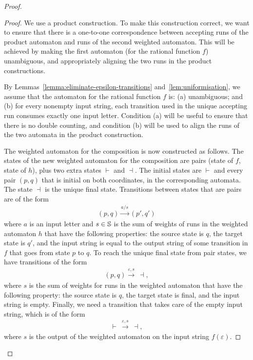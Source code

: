 \begin{proof}
    \begin{proof}
        We use a product construction. To make this construction correct, we want to ensure that there is a one-to-one correspondence between accepting runs of the product automaton and runs of the second weighted automaton. This will be achieved by making the first automaton (for the rational function $f$) unambiguous, and appropriately aligning the two runs in the product constructions.

        By Lemmas~\ref{lemma:eliminate-epsilon-transitions} and~\ref{lem:uniformisation}, we assume that the automaton for the rational function $f$ is: (a) unambiguous; and (b) for every nonempty input string, each transition used in the unique accepting run consumes exactly one input letter. Condition (a) will be useful to ensure that there is no double counting, and condition (b) will be used to align the runs of the two automata in the product construction.

        The weighted automaton for the composition is now constructed as follows.  
        The states of the new weighted automaton for the composition are pairs (state of $f$, state of $h$), plus two extra states $\vdash$ and  $\dashv$. The initial states are $\vdash$ and every pair $(p,q)$ that  is initial on both coordinates, in the corresponding automata. The state $\dashv$ is the unique final state. Transitions between states that are pairs are of the form
        \begin{align*}
        (p,q) \xrightarrow {a/s} (p',q')
        \end{align*}
        where $a$ is an input letter and $s \in \mathbb S$ is the sum of weights of runs in the weighted automaton $h$ that have the following properties: the source state is $q$, the target state is $q'$, and the input string is equal to the output string of some transition in $f$ that goes from state $p$ to $q$. To reach the unique final state from pair states, we have transitions of the form
        \begin{align*}
        (p,q) \xrightarrow {\varepsilon, s} \ \dashv,
        \end{align*}
        where $s$ is the sum of weights for runs in the weighted automaton that have the following property: the source state is $q$, the target state is final, and the input string is empty. Finally, we need a transition that takes care of the empty input string, which is of the form
        \begin{align*}
        \vdash\  \xrightarrow {\varepsilon, s}\  \dashv,
        \end{align*}
        where $s$ is the output of the weighted automaton on the input string $f(\varepsilon)$.
    \end{proof}

\end{proof}


